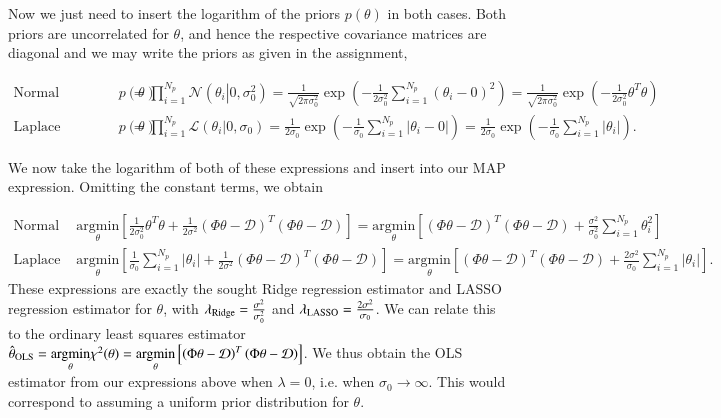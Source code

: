 \documentclass[11pt,a4paper]{article}
\begin{document}
Now we just need to insert the logarithm of the priors $p(\theta)$ in both cases. Both priors are uncorrelated for $\theta$, and hence the respective covariance matrices are diagonal and we may write the priors as given in the assignment,

\begin{align*}
    \text{Normal parameter prior: } p(\theta) &= \prod_{i=1}^{N_p} \mathcal{N}(\theta_i \left\vert\right. 0, \sigma_0^2) = \frac{1}{\sqrt{2\pi\sigma_0^2}} \exp\left({{- \frac{1}{2\sigma_0^2}\sum_{i=1}^{N_p} \left(\theta_i - 0\right)^2}}\right) = \frac{1}{\sqrt{2\pi\sigma_0^2}} \exp\left( -\frac{1}{2\sigma_0^2} \theta^T\theta \right) \\
    \text{Laplace parameter prior: } p(\theta) &= \prod_{i=1}^{N_p} \mathcal{L}(\theta_i \left\vert\right. 0, \sigma_0) = \frac{1}{2\sigma_0} \exp\left(- \frac{1}{\sigma_0}\sum_{i=1}^{N_p} \left\vert\theta_i - 0\right\vert \right) = \frac{1}{2\sigma_0} \exp\left(- \frac{1}{\sigma_0}\sum_{i=1}^{N_p} \left\vert\theta_i\right\vert \right).
\end{align*}

We now take the logarithm of both of these expressions and insert into our MAP expression. Omitting the constant terms, we obtain

\begin{align*}
    \text{Normal prior: } &\underset{\theta}{\mathrm{argmin}} \left[ \frac{1}{2\sigma_0^2}\theta^T\theta  + \frac{1}{2\sigma^2} \left(\Phi \theta -  \mathcal{D} \right)^T\left(\Phi \theta -  \mathcal{D} \right) \right] = \underset{\theta}{\mathrm{argmin}} \left[ \left(\Phi \theta -  \mathcal{D} \right)^T\left(\Phi \theta -  \mathcal{D} \right) + \frac{\sigma^2}{\sigma_0^2}\sum_{i=1}^{N_p} \theta_i^2  \right]  \\
    \text{Laplace prior: } &\underset{\theta}{\mathrm{argmin}} \left[ \frac{1}{\sigma_0}\sum_{i=1}^{N_p} \left\vert\theta_i\right\vert + \frac{1}{2\sigma^2} \left(\Phi \theta -  \mathcal{D} \right)^T\left(\Phi \theta -  \mathcal{D} \right) \right] = \underset{\theta}{\mathrm{argmin}} \left[ \left(\Phi \theta -  \mathcal{D} \right)^T\left(\Phi \theta -  \mathcal{D} \right) + \frac{2\sigma^2}{\sigma_0}\sum_{i=1}^{N_p} \left\vert\theta_i\right\vert  \right].
\end{align*}
These expressions are exactly the sought Ridge regression estimator and LASSO regression estimator for $\theta$, with $\lambda_{\rm Ridge} = \frac{\sigma^2}{\sigma_0^2}$ and $\lambda_{\rm LASSO} = \frac{2\sigma^2}{\sigma_0}$.
We can relate this to the ordinary least squares estimator $\hat{\theta}_{\rm OLS} = \underset{\theta}{\mathrm{argmin}} \chi^2(\theta) = \underset{\theta}{\mathrm{argmin}} \left[ \left(\Phi \theta -  \mathcal{D} \right)^T\left(\Phi \theta -  \mathcal{D} \right) \right]$. We thus obtain the OLS estimator from our expressions above when $\lambda=0$, i.e. when $\sigma_0 \rightarrow \infty$. This would correspond to assuming a uniform prior distribution for $\theta$.
\end{document}
